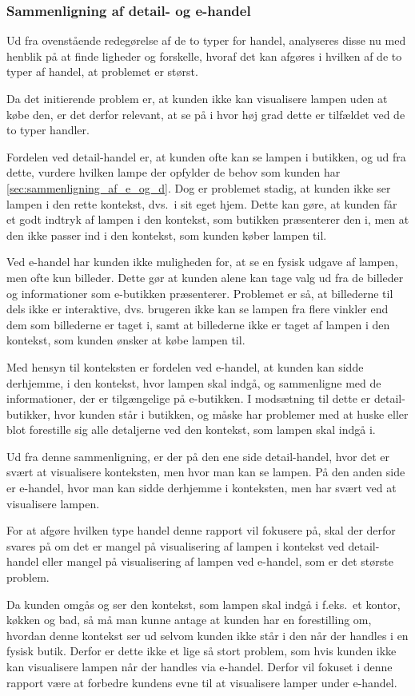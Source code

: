 \subsubsection{Sammenligning af detail- og e-handel}
Ud fra ovenstående redegørelse af de to typer for handel, analyseres disse nu med henblik på at finde ligheder og forskelle, hvoraf det kan afgøres i hvilken af de to typer af handel, at problemet er størst. 

Da det initierende problem er, at kunden ikke kan visualisere lampen uden at købe den, er det derfor relevant, at se på i hvor høj grad dette er tilfældet ved de to typer handler.

Fordelen ved detail-handel er, at kunden ofte kan se lampen i butikken, og ud fra dette, vurdere hvilken lampe der opfylder de behov som kunden har \ref{sec:sammenligning_af_e_og_d}. Dog er problemet stadig, at kunden ikke ser lampen i den rette kontekst, dvs.\ i sit eget hjem. Dette kan gøre, at kunden får et godt indtryk af lampen i den kontekst, som butikken præsenterer den i, men at den ikke passer ind i den kontekst, som kunden køber lampen til.

Ved e-handel har kunden ikke muligheden for, at se en fysisk udgave af lampen, men ofte kun billeder. Dette gør at kunden alene kan tage valg ud fra de billeder og informationer som e-butikken præsenterer. Problemet er så, at billederne til dels ikke er interaktive, dvs. brugeren ikke kan se lampen fra flere vinkler end dem som billederne er taget i, samt at billederne ikke er taget af lampen i den kontekst, som kunden ønsker at købe lampen til. 

Med hensyn til konteksten er fordelen ved e-handel, at kunden kan sidde derhjemme, i den kontekst, hvor lampen skal indgå, og sammenligne med de informationer, der er tilgængelige på e-butikken. I modsætning til dette er detail-butikker, hvor kunden står i butikken, og måske har problemer med at huske eller blot forestille sig alle detaljerne ved den kontekst, som lampen skal indgå i.

Ud fra denne sammenligning, er der på den ene side detail-handel, hvor det er svært at visualisere konteksten, men hvor man kan se lampen. På den anden side er e-handel, hvor man kan sidde derhjemme i konteksten, men har svært ved at visualisere lampen. 

For at afgøre hvilken type handel denne rapport vil fokusere på, skal der derfor svares på om det er mangel på visualisering af lampen i kontekst ved detail-handel eller mangel på visualisering af lampen ved e-handel, som er det største problem.

Da kunden omgås og ser den kontekst, som lampen skal indgå i f.eks.\ et kontor, køkken og bad, så må man kunne antage at kunden har en forestilling om, hvordan denne kontekst ser ud selvom kunden ikke står i den når der handles i en fysisk butik. Derfor er dette ikke et lige så stort problem, som hvis kunden ikke kan visualisere lampen når der handles via e-handel. Derfor vil fokuset i denne rapport være at forbedre kundens evne til at visualisere lamper under e-handel.